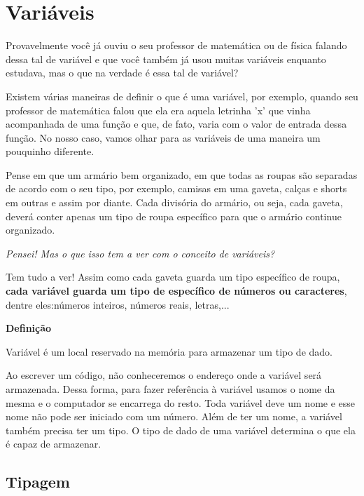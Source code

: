 \documentclass[conference]{IEEEtran}
\begin{document}
\section{\textbf{Variáveis}}
    Provavelmente você já ouviu o seu professor de matemática ou de física falando dessa tal de variável e que você também já usou muitas variáveis enquanto estudava, mas o que na verdade é essa tal de variável?
    \par
    Existem várias maneiras de definir o que é uma variável, por exemplo, quando seu professor de matemática falou que ela era aquela letrinha 'x' que vinha acompanhada de uma função e que, de fato, varia com o valor de entrada dessa função. No nosso caso, vamos olhar para as variáveis de uma maneira um pouquinho diferente.
    \par
    Pense em que um armário bem organizado, em que todas as roupas são separadas de acordo com o seu tipo, por exemplo, camisas em uma gaveta, calças e shorts em outras e assim por diante. Cada divisória do armário, ou seja, cada gaveta, deverá conter apenas um tipo de roupa específico para que o armário continue organizado.
     \par
    \textit{Pensei! Mas o que isso tem a ver com o conceito de variáveis?}
    \par
    Tem tudo a ver! Assim como cada gaveta guarda um tipo específico de roupa, \textbf{cada variável guarda um tipo de específico de números ou caracteres}, dentre eles:números inteiros, números reais, letras,...
    \begin{center}
        \textbf{Definição}
    \end{center}
    \par
    Variável é um local reservado na memória para armazenar um tipo de dado.
    \par
    Ao escrever um código, não conheceremos o endereço onde a variável será armazenada. Dessa forma, para fazer referência à variável usamos o nome da mesma e o computador se encarrega do resto. Toda variável deve um nome e esse nome não pode ser iniciado com um número. Além de ter um nome, a variável também precisa ter um tipo. O tipo de dado de uma variável determina o que ela é capaz de armazenar.
\begin{center}
    \subsection{Tipagem}
\end{center}
    \par
\end{document}
